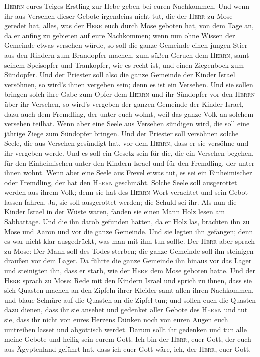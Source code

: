 \textsc{Herrn} eures Teiges Erstling zur Hebe geben bei euren
Nachkommen.  Und wenn ihr aus Versehen dieser Gebote
irgendeins nicht tut, die der \textsc{Herr} zu Mose geredet hat,
 alles, was der \textsc{Herr} euch durch Mose geboten
hat, von dem Tage an, da er anfing zu gebieten auf eure Nachkommen;
 wenn nun ohne Wissen der Gemeinde etwas versehen würde,
so soll die ganze Gemeinde einen jungen Stier aus den Rindern zum
Brandopfer machen, zum süßen Geruch dem \textsc{Herrn}, samt seinem
Speisopfer und Trankopfer, wie es recht ist, und einen Ziegenbock zum
Sündopfer.  Und der Priester soll also die ganze Gemeinde
der Kinder Israel versöhnen, so wird's ihnen vergeben sein; denn es ist
ein Versehen. Und sie sollen bringen solch ihre Gabe zum Opfer dem
\textsc{Herrn} und ihr Sündopfer vor den \textsc{Herrn} über ihr
Versehen,  so wird's vergeben der ganzen Gemeinde der
Kinder Israel, dazu auch dem Fremdling, der unter euch wohnt, weil das
ganze Volk an solchem versehen teilhat.  Wenn aber eine
Seele aus Versehen sündigen wird, die soll eine jährige Ziege zum
Sündopfer bringen.  Und der Priester soll versöhnen
solche Seele, die aus Versehen gesündigt hat, vor dem \textsc{Herrn},
dass er sie versöhne und ihr vergeben werde.  Und es soll
ein Gesetz sein für die, die ein Versehen begehen, für den Einheimischen
unter den Kindern Israel und für den Fremdling, der unter ihnen wohnt.
 Wenn aber eine Seele aus Frevel etwas tut, es sei ein
Einheimischer oder Fremdling, der hat den \textsc{Herrn} geschmäht.
Solche Seele soll ausgerottet werden aus ihrem Volk; 
denn sie hat des \textsc{Herrn} Wort verachtet und sein Gebot lassen
fahren. Ja, sie soll ausgerottet werden; die Schuld sei ihr.
 Als nun die Kinder Israel in der Wüste waren, fanden sie
einen Mann Holz lesen am Sabbattage.  Und die ihn darob
gefunden hatten, da er Holz las, brachten ihn zu Mose und Aaron und vor
die ganze Gemeinde.  Und sie legten ihn gefangen; denn es
war nicht klar ausgedrückt, was man mit ihm tun sollte. 
Der \textsc{Herr} aber sprach zu Mose: Der Mann soll des Todes sterben;
die ganze Gemeinde soll ihn steinigen draußen vor dem Lager.
 Da führte die ganze Gemeinde ihn hinaus vor das Lager
und steinigten ihn, dass er starb, wie der \textsc{Herr} dem Mose
geboten hatte.  Und der \textsc{Herr} sprach zu Mose:
 Rede mit den Kindern Israel und sprich zu ihnen, dass
sie sich Quasten machen an den Zipfeln ihrer Kleider samt allen ihren
Nachkommen, und blaue Schnüre auf die Quasten an die Zipfel tun;
 und sollen euch die Quasten dazu dienen, dass ihr sie
ansehet und gedenket aller Gebote des \textsc{Herrn} und tut sie, dass
ihr nicht von eures Herzens Dünken noch von euren Augen euch umtreiben
lasset und abgöttisch werdet.  Darum sollt ihr gedenken
und tun alle meine Gebote und heilig sein eurem Gott. 
Ich bin der \textsc{Herr}, euer Gott, der euch aus Ägyptenland geführt
hat, dass ich euer Gott wäre, ich, der \textsc{Herr}, euer Gott.

